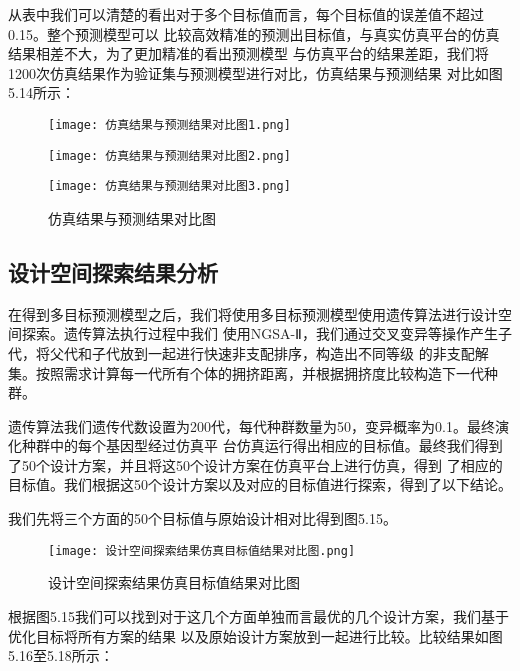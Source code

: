 从表中我们可以清楚的看出对于多个目标值而言，每个目标值的误差值不超过0.15。整个预测模型可以
比较高效精准的预测出目标值，与真实仿真平台的仿真结果相差不大，为了更加精准的看出预测模型
与仿真平台的结果差距，我们将1200次仿真结果作为验证集与预测模型进行对比，仿真结果与预测结果
对比如图5.14所示：

\begin{figure}[!h]
    \centering
    \texttt{[image: 仿真结果与预测结果对比图1.png]}
\end{figure}

\begin{figure}[!h]
    \centering
    \texttt{[image: 仿真结果与预测结果对比图2.png]}
\end{figure}

\begin{figure}[!h]
    \centering
    \texttt{[image: 仿真结果与预测结果对比图3.png]}
    \caption{仿真结果与预测结果对比图}
\end{figure}

\subsection{设计空间探索结果分析}

在得到多目标预测模型之后，我们将使用多目标预测模型使用遗传算法进行设计空间探索。遗传算法执行过程中我们
使用NGSA-Ⅱ，我们通过交叉变异等操作产生子代，将父代和子代放到一起进行快速非支配排序，构造出不同等级
的非支配解集。按照需求计算每一代所有个体的拥挤距离，并根据拥挤度比较构造下一代种群。

遗传算法我们遗传代数设置为200代，每代种群数量为50，变异概率为0.1。最终演化种群中的每个基因型经过仿真平
台仿真运行得出相应的目标值。最终我们得到了50个设计方案，并且将这50个设计方案在仿真平台上进行仿真，得到
了相应的目标值。我们根据这50个设计方案以及对应的目标值进行探索，得到了以下结论。

我们先将三个方面的50个目标值与原始设计相对比得到图5.15。

\begin{figure}
    \centering
    \texttt{[image: 设计空间探索结果仿真目标值结果对比图.png]}
    \caption{设计空间探索结果仿真目标值结果对比图}
    \label{fig:badge}
\end{figure}

根据图5.15我们可以找到对于这几个方面单独而言最优的几个设计方案，我们基于优化目标将所有方案的结果
以及原始设计方案放到一起进行比较。比较结果如图5.16至5.18所示：

